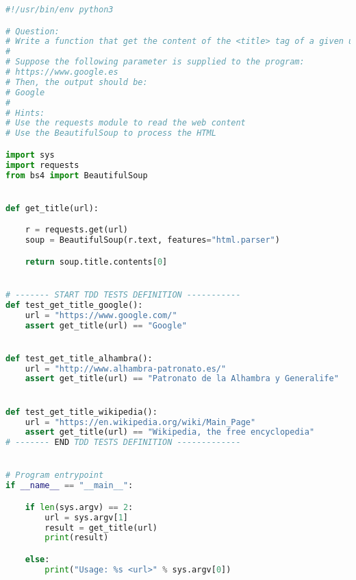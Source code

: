 \begin{lstlisting}[language=python,caption={exercise\_4.py},captionpos=b]
#!/usr/bin/env python3

# Question:
# Write a function that get the content of the <title> tag of a given url
#
# Suppose the following parameter is supplied to the program:
# https://www.google.es
# Then, the output should be:
# Google
#
# Hints:
# Use the requests module to read the web content
# Use the BeautifulSoup to process the HTML

import sys
import requests
from bs4 import BeautifulSoup


def get_title(url):

    r = requests.get(url)
    soup = BeautifulSoup(r.text, features="html.parser")

    return soup.title.contents[0]


# ------- START TDD TESTS DEFINITION -----------
def test_get_title_google():
    url = "https://www.google.com/"
    assert get_title(url) == "Google"


def test_get_title_alhambra():
    url = "http://www.alhambra-patronato.es/"
    assert get_title(url) == "Patronato de la Alhambra y Generalife"


def test_get_title_wikipedia():
    url = "https://en.wikipedia.org/wiki/Main_Page"
    assert get_title(url) == "Wikipedia, the free encyclopedia"
# ------- END TDD TESTS DEFINITION -------------


# Program entrypoint
if __name__ == "__main__":

    if len(sys.argv) == 2:
        url = sys.argv[1]
        result = get_title(url)
        print(result)

    else:
        print("Usage: %s <url>" % sys.argv[0])
\end{lstlisting}

